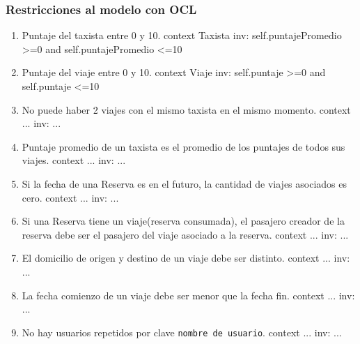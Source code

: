 \subsubsection{Restricciones al modelo con OCL}
\begin{enumerate}
	\item \begin{ocl}{Puntaje del taxista entre 0 y 10.}
		  context Taxista
		  inv: self.puntajePromedio >=0 and
		       self.puntajePromedio <=10
		\end{ocl}
	
	\item \begin{ocl}{Puntaje del viaje entre 0 y 10.}
		  context Viaje
		  inv: self.puntaje >=0 and
		       self.puntaje <=10
		\end{ocl}

	\item \begin{ocl}{No puede haber 2 viajes con el mismo taxista en el mismo momento.}
		  context ...
		  inv: ...
		\end{ocl}

	\item \begin{ocl}{Puntaje promedio de un taxista es el promedio de los puntajes de todos sus viajes.}
		  context ...
		  inv: ...
		\end{ocl}

	\item \begin{ocl}{Si la fecha de una Reserva es en el futuro, la cantidad de viajes asociados es cero.}
		  context ...
		  inv: ...
		\end{ocl}

	\item \begin{ocl}{Si una Reserva tiene un viaje(reserva consumada), el pasajero creador de la reserva debe ser el pasajero del viaje asociado a la reserva.}
		  context ...
		  inv: ...
		\end{ocl}

	\item \begin{ocl}{El domicilio de origen y destino de un viaje debe ser distinto.}
		  context ...
		  inv: ...
		\end{ocl}

	\item \begin{ocl}{La fecha comienzo de un viaje debe ser menor que la fecha fin.}
		  context ...
		  inv: ...
		\end{ocl}

	\item \begin{ocl}{No hay usuarios repetidos por clave \texttt{nombre de usuario}.}
		  context ...
		  inv: ...
		\end{ocl}
\end{enumerate}